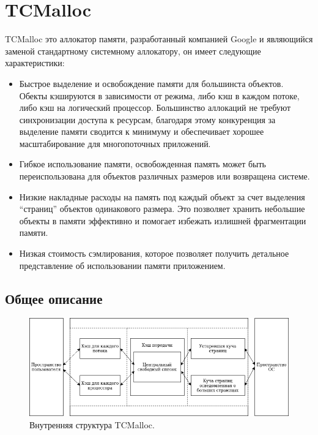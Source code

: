 \section{TCMalloc}
TCMalloc это аллокатор памяти, разработанный компанией Google и являющийся заменой стандартному системному аллокатору, он имеет следующие характеристики:
\begin{itemize}
	\item Быстрое выделение и освобождение памяти для большинста объектов. Обекты кэшируются в зависимости от режима, либо кэш в каждом потоке, либо кэш на логический процессор. Большинство аллокаций не требуют синхронизации доступа к ресурсам, благодаря этому конкуренция за выделение памяти сводится к минимуму и обеспечивает хорошее масштабирование для многопоточных приложений.
	\item Гибкое использование памяти, освобожденная память может быть переиспользована для объектов различных размеров или возвращена системе.
	\item Низкие накладные расходы на память под каждый объект за счет выделения ``страниц'' объектов одинакового размера. Это позволяет хранить небольшие объекты в памяти эффективно и помогает избежать излишней фрагментации памяти.
	\item Низкая стоимость сэмлирования, которое позволяет получить детальное представление об использовании памяти приложением.
\end{itemize}

\subsection{Общее описание}

\begin{figure}[!h]
	\begin{center}
		\includegraphics[scale=0.6]{images/tcmalloc-overview.png}
		\caption{Внутренняя структура TCMalloc.}
		\label{tcmalloc-overview}
	\end{center}
\end{figure}

